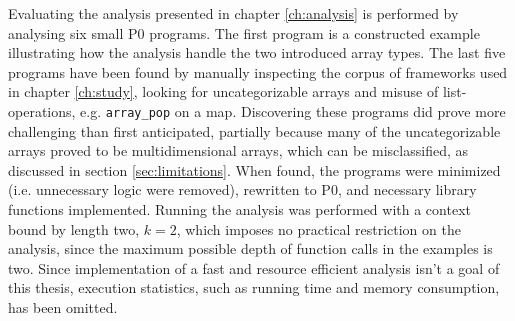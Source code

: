 Evaluating the analysis presented in chapter \ref{ch:analysis} is performed by analysing six small P0 programs. The first program is a constructed example illustrating how the analysis handle the two introduced array types. The last five programs have been found by manually inspecting the corpus of frameworks used in chapter \ref{ch:study}, looking for uncategorizable arrays and misuse of list-operations, e.g. \texttt{array\_pop} on a map. Discovering these programs did prove more challenging than first anticipated, partially because many of the uncategorizable arrays proved to be multidimensional arrays, which can be misclassified, as discussed in section \ref{sec:limitations}. When found, the programs were minimized (i.e. unnecessary logic were removed), rewritten to P0, and necessary library functions implemented. Running the analysis was performed with a context bound by length two, $k=2$, which imposes no practical restriction on the analysis, since the maximum possible depth of function calls in the examples is two. Since implementation of a fast and resource efficient analysis isn't a goal of this thesis, execution statistics, such as running time and memory consumption, has been omitted. 


